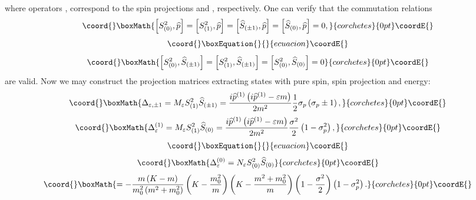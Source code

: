 \documentclass[a4paper,12pt]{article}
\begin{document}
where operators \coordHE{}, \coordHE{}
correspond to the spin projections \coordHE{} and  \coordHE{},
respectively. One can verify that the commutation relations
\[\coord{}\boxMath{
\left[ S_{(0)}^2,\widehat{p}\right] =\left[
S_{(1)}^2,\widehat{p}\right] =\left[ \widehat{S}_{(\pm
1)},\widehat{p}\right] =\left[ \widehat{S}_{(0)},
\widehat{p}\right] =0,
}{corchetes}{0pt}\coordE{}\]
\vspace{-8mm}
\begin{equation}\coord{}\boxEquation{
\label{52}
}{
}{ecuacion}\coordE{}\end{equation}
\vspace{-8mm}
\[\coord{}\boxMath{
\left[ S_{(0)}^2,\widehat{S}_{(\pm 1)}\right] =\left[
S_{(1)}^2,\widehat{S} _{(\pm 1)}\right] =\left[
S_{(0)}^2,\widehat{S}_{(0)}\right] =0
}{corchetes}{0pt}\coordE{}\]
are valid. Now we may construct the projection matrices extracting
states with pure spin, spin projection and energy:
\[\coord{}\boxMath{
\Delta _{\varepsilon ,\pm 1}=M_\varepsilon
S_{(1)}^2\widehat{S}_{(\pm 1)}= \frac{i\widehat{p}^{(1)}\left(
i\widehat{p}^{(1)}-\varepsilon m\right) }{2m^2}\frac 12\sigma
_p\left( \sigma _p\pm 1\right),
}{corchetes}{0pt}\coordE{}\]
\[\coord{}\boxMath{
\Delta _\varepsilon ^{(1)}=M_\varepsilon
S_{(1)}^2\widehat{S}_{(0)}=\frac{i \widehat{p}^{(1)}\left(
i\widehat{p}^{(1)}-\varepsilon m\right) }{2m^2}\frac{\sigma ^2}
2\left( 1-\sigma _p^2\right),
}{corchetes}{0pt}\coordE{}\]
\vspace{-8mm}
\begin{equation}\coord{}\boxEquation{
\label{53}
}{
}{ecuacion}\coordE{}\end{equation}
\vspace{-8mm}
\[\coord{}\boxMath{
\Delta _\varepsilon ^{(0)}=N_\varepsilon
S_{(0)}^2\widehat{S}_{(0)}
}{corchetes}{0pt}\coordE{}\]
\[\coord{}\boxMath{
=-\frac{m\left(K-m\right)}{m_0^2\left(m^2+m_0^2\right)}
\left(K-\frac{m_0^2}{m}\right) \left(K-\frac{m^2+m_0^2}{m}\right)
\left( 1-\frac{ \sigma ^2}2\right) \left( 1-\sigma _p^2\right).
}{corchetes}{0pt}\coordE{}\]
\end{document}
